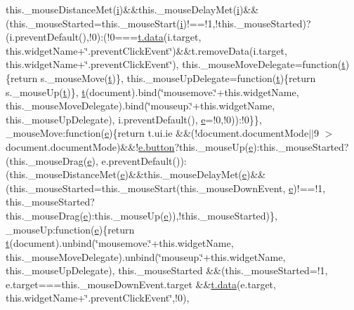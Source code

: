 \begin{DoxyCompactItemize}
this.\+\_\+mouse\+Distance\+Met(\hyperlink{jquery-ui_8min_8js_a83e0f8a79d7f496783fc7527db51773e}{i})\&\&this.\+\_\+mouse\+Delay\+Met(\hyperlink{jquery-ui_8min_8js_a83e0f8a79d7f496783fc7527db51773e}{i})\&\&(this.\+\_\+mouse\+Started=this.\+\_\+mouse\+Start(\hyperlink{jquery-ui_8min_8js_a83e0f8a79d7f496783fc7527db51773e}{i})!==!1,!this.\+\_\+mouse\+Started)?(i.\+prevent\+Default(),!0)\+:(!0===\hyperlink{components_2_ossn_comments_2actions_2comment_2edit_8php_a2b67189b42ab547221cb2a6408f4746a}{t.\+data}(i.\+target, this.\+widget\+Name+\char`\"{}.prevent\+Click\+Event\char`\"{})\&\&t.\+remove\+Data(i.\+target, this.\+widget\+Name+\char`\"{}.prevent\+Click\+Event\char`\"{}), this.\+\_\+mouse\+Move\+Delegate=function(\hyperlink{jquery-ui_8min_8js_acf335ef347969ef6dc8387e680fb289e}{t})\{return s.\+\_\+mouse\+Move(\hyperlink{jquery-ui_8min_8js_acf335ef347969ef6dc8387e680fb289e}{t})\}, this.\+\_\+mouse\+Up\+Delegate=function(\hyperlink{jquery-ui_8min_8js_acf335ef347969ef6dc8387e680fb289e}{t})\{return s.\+\_\+mouse\+Up(\hyperlink{jquery-ui_8min_8js_acf335ef347969ef6dc8387e680fb289e}{t})\}, \hyperlink{jquery-ui_8min_8js_acf335ef347969ef6dc8387e680fb289e}{t}(document).bind(\char`\"{}mousemove.\char`\"{}+this.\+widget\+Name, this.\+\_\+mouse\+Move\+Delegate).bind(\char`\"{}mouseup.\char`\"{}+this.\+widget\+Name, this.\+\_\+mouse\+Up\+Delegate), i.\+prevent\+Default(), \hyperlink{jquery-ui_8min_8js_abea95a4e94bc6f4151d5683d4c12c3f4}{e}=!0,!0))\+:!0\}\}, \+\_\+mouse\+Move\+:function(\hyperlink{jquery-ui_8min_8js_abea95a4e94bc6f4151d5683d4c12c3f4}{e})\{return t.\+ui.\+ie \&\&(!document.\+document\+Mode$\vert$$\vert$9 $>$document.\+document\+Mode)\&\&!\hyperlink{bootstrap_8min_8js_a55e170814e74f6c3db8ae9ea3ba9054f}{e.\+button}?this.\+\_\+mouse\+Up(\hyperlink{jquery-ui_8min_8js_abea95a4e94bc6f4151d5683d4c12c3f4}{e})\+:this.\+\_\+mouse\+Started?(this.\+\_\+mouse\+Drag(\hyperlink{jquery-ui_8min_8js_abea95a4e94bc6f4151d5683d4c12c3f4}{e}), e.\+prevent\+Default())\+:(this.\+\_\+mouse\+Distance\+Met(\hyperlink{jquery-ui_8min_8js_abea95a4e94bc6f4151d5683d4c12c3f4}{e})\&\&this.\+\_\+mouse\+Delay\+Met(\hyperlink{jquery-ui_8min_8js_abea95a4e94bc6f4151d5683d4c12c3f4}{e})\&\&(this.\+\_\+mouse\+Started=this.\+\_\+mouse\+Start(this.\+\_\+mouse\+Down\+Event, \hyperlink{jquery-ui_8min_8js_abea95a4e94bc6f4151d5683d4c12c3f4}{e})!==!1, this.\+\_\+mouse\+Started?this.\+\_\+mouse\+Drag(\hyperlink{jquery-ui_8min_8js_abea95a4e94bc6f4151d5683d4c12c3f4}{e})\+:this.\+\_\+mouse\+Up(\hyperlink{jquery-ui_8min_8js_abea95a4e94bc6f4151d5683d4c12c3f4}{e})),!this.\+\_\+mouse\+Started)\}, \+\_\+mouse\+Up\+:function(\hyperlink{jquery-ui_8min_8js_abea95a4e94bc6f4151d5683d4c12c3f4}{e})\{return \hyperlink{jquery-ui_8min_8js_acf335ef347969ef6dc8387e680fb289e}{t}(document).unbind(\char`\"{}mousemove.\char`\"{}+this.\+widget\+Name, this.\+\_\+mouse\+Move\+Delegate).unbind(\char`\"{}mouseup.\char`\"{}+this.\+widget\+Name, this.\+\_\+mouse\+Up\+Delegate), this.\+\_\+mouse\+Started \&\&(this.\+\_\+mouse\+Started=!1, e.\+target===this.\+\_\+mouse\+Down\+Event.\+target \&\&\hyperlink{components_2_ossn_comments_2actions_2comment_2edit_8php_a2b67189b42ab547221cb2a6408f4746a}{t.\+data}(e.\+target, this.\+widget\+Name+\char`\"{}.prevent\+Click\+Event\char`\"{},!0), 
\end{DoxyCompactItemize}

